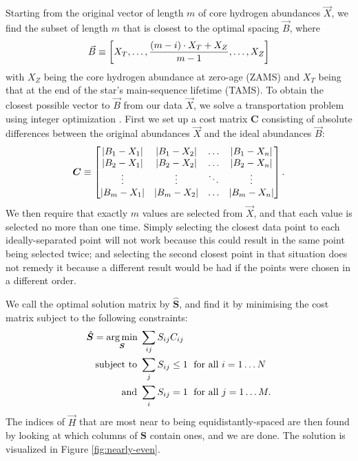 \documentclass[manuscript]{aastex}
\begin{document}
Starting from the original vector of length $m$ of core hydrogen abundances $\vec X$, we find the subset of length $m$ that is closest to the optimal spacing $\vec B$, where
\begin{equation}
  \vec B \equiv \qty[
    X_T, 
    \ldots,
    \frac{(m-i)\cdot X_T + X_Z}{m-1}, 
    \ldots, 
    X_Z
  ]
\end{equation}
with $X_Z$ being the core hydrogen abundance at zero-age (ZAMS) and $X_T$ being that at the end of the star's main-sequence lifetime (TAMS). To obtain the closest possible vector to $\vec B$ from our data $\vec X$, we solve a transportation problem using integer optimization \citep{23145595}. First we set up a cost matrix $\boldsymbol{C}$ consisting of absolute differences between the original abundances $\vec X$ and the ideal abundances $\vec B$:
\begin{equation}
  \boldsymbol C \equiv 
  \begin{bmatrix}
    \abs{B_1-X_1} & \abs{B_1-X_2} & \dots & \abs{B_1-X_n} \\ 
    \abs{B_2-X_1} & \abs{B_2-X_2} & \dots & \abs{B_2-X_n} \\ 
    \vdots & \vdots & \ddots & \vdots\\ 
    \abs{B_m-X_1} & \abs{B_m-X_2} & \dots & \abs{B_m-X_n}
  \end{bmatrix}.
\end{equation}
We then require that exactly $m$ values are selected from $\vec X$, and that each value is selected no more than one time. Simply selecting the closest data point to each ideally-separated point will not work because this could result in the same point being selected twice; and selecting the second closest point in that situation does not remedy it because a different result would be had if the points were chosen in a different order. 

We call the optimal solution matrix by $\hat{\boldsymbol{S}}$, and find it by minimising the cost matrix subject to the following constraints:
\begin{align}
  \hat{\boldsymbol{S}} = \underset{\boldsymbol S}{\arg\min} \; & \sum_{ij} S_{ij} C_{ij} \notag\\
  \text{subject to } & \sum_j S_{ij} \leq 1 \; \text{ for all } i=1\ldots N \notag\\
  \text{and } & \sum_i S_{ij} = 1 \; \text{ for all } j=1\ldots M.
  \label{eq:optimal-spacing}
\end{align}
The indices of $\vec H$ that are most near to being equidistantly-spaced are then found by looking at which columns of $\boldsymbol S$ contain ones, and we are done. The solution is visualized in Figure \ref{fig:nearly-even}.
\end{document}
